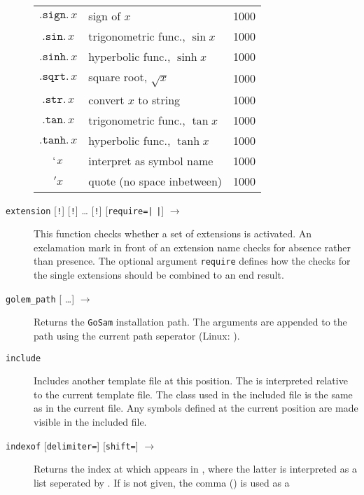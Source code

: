 \documentclass[11pt,a4paper]{refrep}
\newcommand{\golem}{{\tt GoSam}\xspace}
\begin{document}
\begin{description}
\begin{center}
\begin{longtable}{|c|p{12em}|r|}
   $\mathtt{.sign.}\,x$ & sign of $x$ & 1000\\
   $\mathtt{.sin.}\,x$ & trigonometric func., $\sin x$ & 1000\\
   $\mathtt{.sinh.}\,x$ & hyperbolic func., $\sinh x$ & 1000\\
   $\mathtt{.sqrt.}\,x$ & square root, $\sqrt{x}$ & 1000\\
   $\mathtt{.str.}\,x$ & convert $x$ to string & 1000\\
   $\mathtt{.tan.}\,x$ & trigonometric func., $\tan x$ & 1000\\
   $\mathtt{.tanh.}\,x$ & hyperbolic func., $\tanh x$ & 1000\\
   $\mathtt{`}\,x$ & interpret as symbol name & 1000\\
   $\mathtt{'}x$ & quote (no space inbetween) & 1000\\
   \end{longtable}
   \end{center}
\item[\texttt{extension} {[\texttt{!}]}\synt{name$_1$} 
   {[\texttt{!}]}\synt{name$_2$} \dots
   {[\texttt{!}]}\synt{name$_n$} {[\texttt{require=}\lit{all}\texttt{|}%
\lit{any}\texttt{|}\lit{no}]} $\to$ \synt{logical}]
   This function checks whether a set of extensions is activated.
   An exclamation mark in front of an extension name checks for absence
   rather than presence. The optional argument \texttt{require}
   defines how the checks for the single extensions should be combined
   to an end result.
\item[\texttt{golem\_path} {[\synt{arg$_1$} \ldots \synt{arg$_n$}]} $\to$
   \synt{string}]
   Returns the \golem{} installation path. The arguments are appended to
   the path using the current path seperator (Linux: \lit{/}).
\item[\texttt{include} \synt{file-name}] Includes another template file
   at this position. The  is interpreted relative to the
   current template file. The class used in the included file is the same
   as in the current file. Any symbols defined at the current position
   are made visible in the included file.
\item[\texttt{indexof} \synt{needle} \synt{haystack}
   {[\texttt{delimiter=}\synt{delimiter}]}
   {[\texttt{shift=}\synt{shift}]} $\to$ \synt{integer}]
   Returns the index at which  appears in ,
   where the latter is interpreted as a list seperated by .
   If  is not given, the comma (\lit{,}) is used as a

\end{description}
\end{document}
